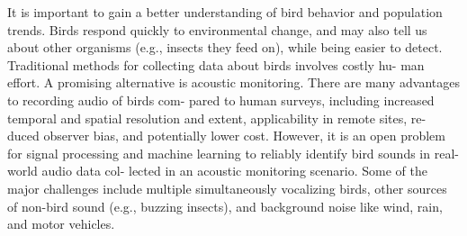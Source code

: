 \cite{BriggsMLSP13} It is important to gain a better understanding of bird behavior
and population trends. Birds respond quickly to environmental change, and may also tell us about other organisms (e.g.,
insects they feed on), while being easier to detect. Traditional
methods for collecting data about birds involves costly hu-
man effort. A promising alternative is acoustic monitoring.
There are many advantages to recording audio of birds com-
pared to human surveys, including increased temporal and
spatial resolution and extent, applicability in remote sites, re-
duced observer bias, and potentially lower cost. However, it is
an open problem for signal processing and machine learning
to reliably identify bird sounds in real-world audio data col-
lected in an acoustic monitoring scenario. Some of the major
challenges include multiple simultaneously vocalizing birds,
other sources of non-bird sound (e.g., buzzing insects), and
background noise like wind, rain, and motor vehicles.
